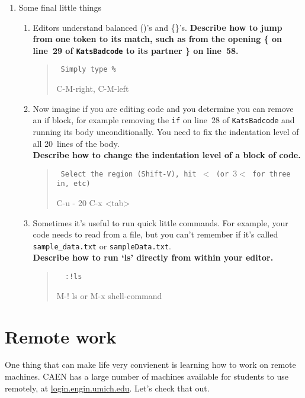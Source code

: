 \documentclass{article}
\begin{document}
\begin{enumerate}
\begin{quote}
      \end{quote}
    \item Some final little things
    \small
    \begin{enumerate}
      \item Editors understand balanced ()'s and \{\}'s.
        \textbf{Describe how to jump from one token to its match, such as from
          the opening \{ on line~29 of \texttt{KatsBadcode} to its partner \}
          on line~58.
        }
        \begin{quote}\tt
          \color{blue}Simply type \%

          \color{red} C-M-right, C-M-left
        \end{quote}
      \item Now imagine if you are editing code and you determine you can
        remove an if block, for example removing the \texttt{if} on line~28 of
        \texttt{KatsBadcode} and running its body unconditionally. You need to
        fix the indentation level of all 20~lines of the body.\\
        \textbf{Describe how to change the indentation level of a block of code.}
        \begin{quote}\tt
          \color{blue} Select the region (Shift-V), hit $<$ (or $3<$ for three in, etc)

          \color{red} C-u - 20 C-x <tab>
        \end{quote}
      \item Sometimes it's useful to run quick little commands. For example,
        your code needs to read from a file, but you can't remember if it's
        called \texttt{sample\_data.txt} or \texttt{sampleData.txt}.\\
        \textbf{Describe how to run `ls' directly from within your editor.}
        \begin{quote}\tt
          {\color{blue} :!ls}

          {\color{red} M-! ls} or {\color{red} M-x shell-command}
        \end{quote}
    \end{enumerate}
\end{enumerate}


\newpage
\section{Remote work}
One thing that can make life very convienent is learning how to work on remote
machines. CAEN has a large number of machines available for students to use
remotely, at \url{login.engin.umich.edu}. Let's check that out.
\end{document}
